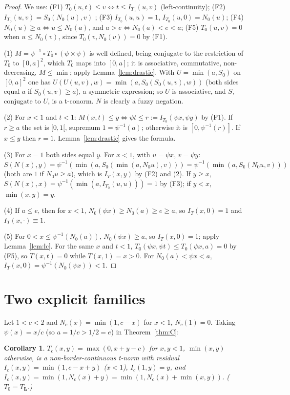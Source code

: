 \documentclass[11pt]{amsart}
\newtheorem{corollary}[theorem]{Corollary}
\theoremstyle{remark}
\begin{document}
\begin{proof}
We use: (F1) $T_0(u,t)\le v\iff t\le I_{T_0}(u,v)$ (left-continuity);
(F2) $I_{T_0}(u,v)=S_0(N_0(u),v)$ \cite[Theorem~5.13]{BJ2010}; (F3)
$I_{T_0}(u,u)=1$, $I_{T_0}(u,0)=N_0(u)$; (F4) $N_0(u)\ge a\iff u\le N_0(a)$,
and $a>e\iff N_0(a)<e<a$; (F5) $T_0(u,v)=0$ when $u\le N_0(v)$, since
$T_0(v,N_0(v))=0$ by (F1).

(1) $M=\psi^{-1}\circ T_0\circ(\psi\times\psi)$ is well defined, being
conjugate to the restriction of $T_0$ to $[0,a]^2$, which $T_0$ maps into
$[0,a]$; it is associative, commutative, non-decreasing, $M\le\min$; apply
Lemma~\ref{lem:drastic}. With $U=\min(a,S_0)$ on $[0,a]^2$ one has
$U(U(u,v),w)=\min(a,S_0(S_0(u,v),w))$ (both sides equal $a$ if
$S_0(u,v)\ge a$), a symmetric expression; so $U$ is associative, and $S$,
conjugate to $U$, is a t-conorm. $N$ is clearly a fuzzy negation.

(2) For $x<1$ and $t<1$: $M(x,t)\le y\iff \psi t\le r:=I_{T_0}(\psi x,\psi y)$
by (F1). If $r\ge a$ the set is $[0,1[$, supremum $1=\psi^{-1}(a)$; otherwise
it is $[0,\psi^{-1}(r)]$. If $x\le y$ then $r=1$. Lemma~\ref{lem:drastic}
gives the formula.

(3) For $x=1$ both sides equal $y$. For $x<1$, with $u=\psi x$, $v=\psi y$:
$S(N(x),y)=\psi^{-1}(\min(a,S_0(\min(a,N_0u),v)))=
\psi^{-1}(\min(a,S_0(N_0u,v)))$ (both are $1$ if $N_0u\ge a$), which is
$I_T(x,y)$ by (F2) and (2). If $y\ge x$, $S(N(x),x)=\psi^{-1}(\min(a,I_{T_0}(u,u)))=1$ by
(F3); if $y<x$, $\min(x,y)=y$.

(4) If $a\le e$, then for $x<1$, $N_0(\psi x)\ge N_0(a)\ge e\ge a$, so
$I_T(x,0)=1$ and $I_T(x,\cdot)\equiv1$.

(5) For $0<x\le\psi^{-1}(N_0(a))$, $N_0(\psi x)\ge a$, so $I_T(x,0)=1$;
apply Lemma~\ref{lem:lc}. For the same $x$ and $t<1$,
$T_0(\psi x,\psi t)\le T_0(\psi x,a)=0$ by (F5), so $T(x,t)=0$ while
$T(x,1)=x>0$. For $N_0(a)<\psi x<a$, $I_T(x,0)=\psi^{-1}(N_0(\psi x))<1$.
\end{proof}

\section{Two explicit families}

Let $1<c<2$ and $N_c(x)=\min(1,c-x)$ for $x<1$, $N_c(1)=0$. Taking
$\psi(x)=x/c$ (so $a=1/c>1/2=e$) in Theorem~\ref{thm:C}:

\begin{corollary}\label{cor:A}
$T_c(x,y)=\max(0,x+y-c)$ for $x,y<1$, $\min(x,y)$ otherwise, is a
non-border-continuous t-norm with residual $I_c(x,y)=\min(1,c-x+y)$ ($x<1$),
$I_c(1,y)=y$, and $I_c(x,y)=\min(1,N_c(x)+y)=\min(1,N_c(x)+\min(x,y))$.
($T_0=T_{\mathbf L}$.)
\end{corollary}
\end{document}
